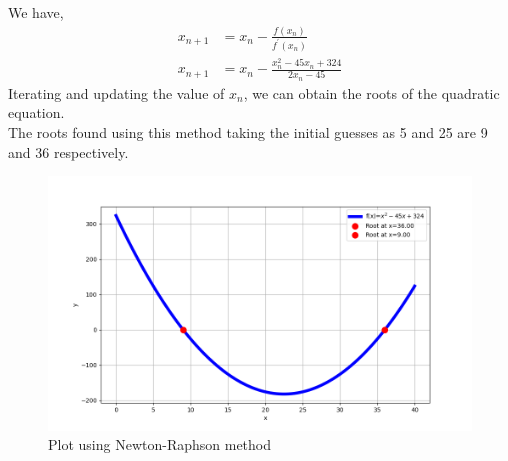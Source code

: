 \documentclass[journal,12pt,onecolumn]{IEEEtran}
\theoremstyle{remark}
\begin{document}
		We have, 
		\begin{align}
			x_{n+1} &= x_{n} - \frac{f(x_{n})}{f^{\prime}(x_{n})}	\\
			x_{n+1} &= x_{n} - \frac{x_{n}^2 - 45x_{n} + 324}{2 x_{n} - 45}
		\end{align}
		Iterating and updating the value of $x_{n}$, we can obtain the roots of the quadratic equation. \\
		The roots found using this method taking the initial guesses as 5 and 25 are 9 and 36
 respectively.
\begin{figure}[h]
\centering
\includegraphics[width=\columnwidth]{figs/Q5.png}
\caption{Plot using Newton-Raphson method}
\label{fig:Plot1} 
\end{figure}
\end{document}

